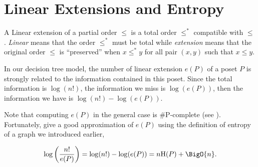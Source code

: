 \section{Linear Extensions and Entropy}

A Linear extension of a partial order $\leq$ is a total order $\leq^*$
compatible with $\leq$. \emph{Linear} means that the order $\leq^*$ must be
total while \emph{extension} means that the original order $\leq$ is
``preserved'' \ie when \(x \leq^* y\) for all pair \((x,y)\) such that \(x
\leq y\).

In our decision tree model, the number of linear extension $e(P)$ of a poset
$P$ is strongly related to the information contained in this poset. Since the
total information is $\log(n!)$, the information we miss is $\log(e(P))$, then
the information we have is $\log(n!) - \log(e(P))$.


Note that computing $e(P)$ in the general case is \#P-complete
(see \citet*{brightwell1991counting}). Fortunately, \citet*{kahn:1995} give a good
approximation of $e(P)$ using the definition of entropy of a graph we
introduced earlier,

\begin{equation}
\log\left(\frac{n!}{e(P)}\right) = \log(n!) - \log(e(P)) = n \text{H}(P) +
\BigO{n}.
\label{eq:khankim1}
\end{equation}
